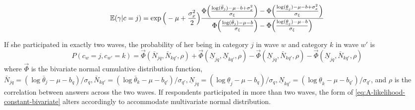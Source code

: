 \documentclass[emulatestandardclasses, 10pt, abstract = true]{scrartcl}
\begin{document}
\begin{equation}
\mathbb E(\gamma|c=j)=\exp\Big(-\mu+{\sigma_x^2\over 2}\Big){\Phi\Big({\log(\bar{\theta}_j)-\mu-b+\sigma_x^2\over \sigma_{\xi}}\Big)-\Phi\Big({\log(\underline{\theta}_j)-\mu-b+\sigma_x^2\over \sigma_{\xi}}\Big)\over \Phi\Big({\log(\bar{\theta}_j)-\mu-b\over \sigma_\xi}\Big)-\Phi\Big({\log(\underline{\theta}_j)-\mu-b\over \sigma_\xi}\Big)}
\label{eq:A-conditional-expectation}
\end{equation}

If she participated in exactly two waves, the probability of her being in category $j$ in wave $w$ and category $k$ in wave $w'$ is
\begin{equation}
P(c_w=j, c_{w'}=k)=\vec{\Phi}(\bar N_{jq}, \bar N_{kq'},\rho)+\vec{\Phi}(\underline N_{jq}, \underline N_{kq'},\rho)-\vec{\Phi}(\underline N_{jq}, \bar N_{kq'},\rho)-\vec{\Phi}(\underline N_{jq}, \bar N_{kq'},\rho)
\label{eq:A-likelihood-constant-bivariate}
\end{equation}
where $\vec{\Phi}$ is the bivariate normal cumulative distribution function, $\bar N_{jq}=(\log \bar \theta_j-\mu-b_q)/\sigma_q,\bar N_{kq'}=(\log \bar \theta_k-\mu-b_{q'})/\sigma_{q'}, \underline N_{jq}=(\log \underline \theta_j-\mu-b_q)/\sigma_q, \underline N_{kq'}=(\log \underline \theta_k-\mu-b_{q'})/\sigma_{q'}$, and $\rho$ is the correlation between answers across the two waves. If respondents participated in more than two waves, the form of \eqref{eq:A-likelihood-constant-bivariate} alters accordingly to accommodate multivariate normal distribution.
\end{document}
